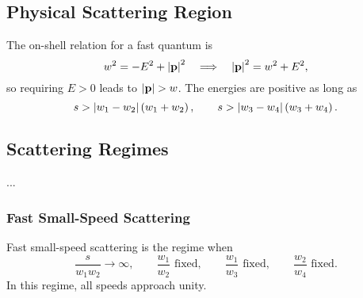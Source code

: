 \subsection{Physical Scattering Region}
The on-shell relation for a fast quantum is
\begin{equation}
	w^{2} = -E^{2} + \left\lvert \mathbf{p} \right\rvert^{2} \quad \Longrightarrow \quad \left\lvert \mathbf{p} \right\rvert^{2} = w^{2} + E^{2},
\end{equation}
so requiring $E > 0$ leads to $\left\lvert \mathbf{p} \right\rvert > w$. The energies are positive as long as
\begin{equation}
	s > \left\lvert w_{1} - w_{2} \right\rvert \left( w_{1} + w_{2} \right), \qquad s > \left\lvert w_{3} - w_{4} \right\rvert \left( w_{3} + w_{4} \right).
\end{equation}
\subsection{Scattering Regimes}
...
\subsubsection{Fast Small-Speed Scattering}
Fast small-speed scattering is the regime when
\begin{equation}
	\frac{s}{w_{1} w_{2}} \rightarrow \infty, \qquad \frac{w_{1}}{w_{2}} \text{ fixed}, \qquad \frac{w_{1}}{w_{3}} \text{ fixed}, \qquad \frac{w_{2}}{w_{4}} \text{ fixed}.
\end{equation}
In this regime, all speeds approach unity.
